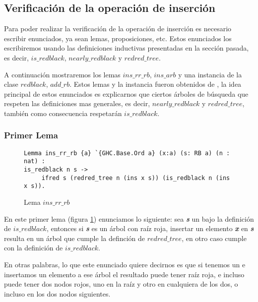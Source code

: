 \subsection{Verificación de la operación de inserción}

Para poder realizar la verificaci\'on de la operaci\'on de inserci\'on es necesario escribir
enunciados, ya sean lemas, proposiciones, etc. Estos enunciados los escribiremos usando las 
definiciones inductivas presentadas en la secci\'on pasada, es decir, 
\hyperref[inductive_isRedB]{$is\_redblack$}, \hyperref[inductive_isRedB]{$nearly\_redblack$} y 
\hyperref[inductive_isRedB]{$redred\_tree$}.

A continuaci\'on mostraremos los lemas \hyperref[lema_1]{$ins\_rr\_rb$}, 
\hyperref[lema_2]{$ins\_arb$} y una instancia \cite{classes} de la clase 
\hyperref[class_rb]{$redblack$}, $add\_rb$. Estos lemas y la instancia fueron obtenidos de 
\cite{MSetRBT}, la idea principal de estos enunciados es explicarnos que ciertos \'arboles de 
b\'usqueda que respeten las definiciones mas generales, es decir, 
\hyperref[inductive_isRedB]{$nearly\_redblack$} y \hyperref[inductive_isRedB]{$redred\_tree$}, 
también como consecuencia respetar\'an \hyperref[inductive_isRedB]{$is\_redblack$}.

\subsubsection{Primer Lema}

\begin{figure}[!ht]
\centering
\captionsetup{justification=centering}
\begin{verbatim}
Lemma ins_rr_rb {a} `{GHC.Base.Ord a} (x:a) (s: RB a) (n : nat) :
is_redblack n s ->
     ifred s (redred_tree n (ins x s)) (is_redblack n (ins x s)).
\end{verbatim}
\caption{Lema $ins\_rr\_rb$}
\label{lema_1}
\end{figure}

En este primer lema (figura \ref{lema_1}) enunciamos lo siguiente: sea \textit{\textbf{s}} un {\arn} 
bajo la definici\'on de \hyperref[inductive_isRedB]{$is\_redblack$}, entonces si \textit{\textbf{s}} 
es un \'arbol con raíz roja, insertar un elemento \textit{\textbf{x}} en \textit{\textbf{s}} resulta 
en un \'arbol que cumple la definci\'on de \hyperref[inductive_isRedB]{$redred\_tree$}, en otro caso 
cumple con la definici\'on de \hyperref[inductive_isRedB]{$is\_redblack$}.

En otras palabras, lo que este enunciado quiere decirnos es que si tenemos un {\arn} e insertamos
un elemento a ese \'arbol el resultado puede tener ra\'iz roja, e incluso puede tener dos nodos
rojos, uno en la ra\'iz y otro en cualquiera de los dos, o incluso en los dos nodos siguientes.

